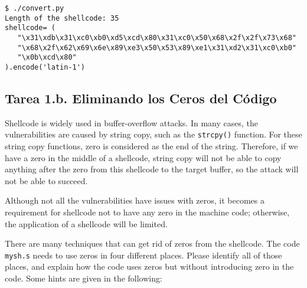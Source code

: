 \begin{lstlisting}
$ ./convert.py
Length of the shellcode: 35
shellcode= (
   "\x31\xdb\x31\xc0\xb0\xd5\xcd\x80\x31\xc0\x50\x68\x2f\x2f\x73\x68"
   "\x68\x2f\x62\x69\x6e\x89\xe3\x50\x53\x89\xe1\x31\xd2\x31\xc0\xb0"
   "\x0b\xcd\x80"
).encode('latin-1')
\end{lstlisting}



\subsection{Tarea 1.b. Eliminando los Ceros del Código}

Shellcode is widely used in buffer-overflow attacks. In many 
cases, the vulnerabilities are caused by string copy, such
as the \texttt{strcpy()} function. For these string copy functions,
zero is considered as the end of the string. Therefore, if we have 
a zero in the middle of a shellcode, string copy will not be able to
copy anything after the zero from this shellcode to the target 
buffer, so the attack will not be able to succeed. 

Although not all the vulnerabilities have issues with zeros, 
it becomes a requirement for shellcode not to have any zero in
the machine code; otherwise, the application of a shellcode 
will be limited. 

There are many techniques that can get rid of zeros 
from the shellcode. The code \texttt{mysh.s} needs to 
use zeros in four different places. Please identify all
of those places, and explain how the code uses zeros
but without introducing zero in the code. Some hints 
are given in the following:


